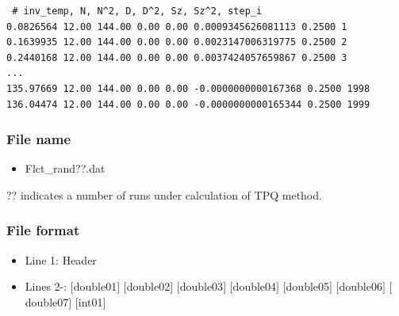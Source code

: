 \begin{minipage}{15cm}
\begin{screen}
\begin{verbatim}
 # inv_temp, N, N^2, D, D^2, Sz, Sz^2, step_i
0.0826564 12.00 144.00 0.00 0.00 0.0009345626081113 0.2500 1
0.1639935 12.00 144.00 0.00 0.00 0.0023147006319775 0.2500 2
0.2440168 12.00 144.00 0.00 0.00 0.0037424057659867 0.2500 3
...
135.97669 12.00 144.00 0.00 0.00 -0.0000000000167368 0.2500 1998
136.04474 12.00 144.00 0.00 0.00 -0.0000000000165344 0.2500 1999
\end{verbatim}
\end{screen}
\end{minipage}

\subsubsection{File name}
 \begin{itemize}
   \item Flct\_rand??.dat
  \end{itemize}
  ?? indicates a number of runs under calculation of TPQ method.

\subsubsection{File format}
\begin{itemize}
   \item Line 1: Header
   \item Lines 2-: $[$double01$]$ $[$double02$]$ $[$double03$]$ $[$double04$]$ $[$double05$]$ $[$double06$]$ $[$double07$]$ $[$int01$]$
  \end{itemize}

